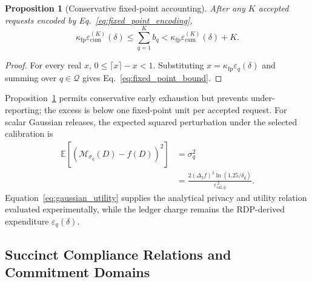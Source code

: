 \documentclass[10pt,journal,compsoc]{IEEEtran}
\newtheorem{proposition}{Proposition}
\begin{document}
\begin{proposition}[Conservative fixed-point accounting]
\label{prop:fixed_point_conservatism}
After any $K$ accepted requests encoded by Eq.~\eqref{eq:fixed_point_encoding},
\begin{equation}
\kappa_{\mathrm{fp}}
\varepsilon_{\mathrm{cum}}^{(K)}(\delta)
\leq
\sum_{q=1}^{K}b_q
<
\kappa_{\mathrm{fp}}
\varepsilon_{\mathrm{cum}}^{(K)}(\delta)
+
K.
\label{eq:fixed_point_bound}
\end{equation}
\end{proposition}

\begin{proof}
For every real $x$, $0\leq\lceil x\rceil-x<1$. Substituting $x=\kappa_{\mathrm{fp}}\varepsilon_q(\delta)$ and summing over $q\in\mathcal{Q}$ gives Eq.~\eqref{eq:fixed_point_bound}.
\end{proof}

Proposition~\ref{prop:fixed_point_conservatism} permits conservative early exhaustion but prevents under-reporting; the excess is below one fixed-point unit per accepted request. For scalar Gaussian releases, the expected squared perturbation under the selected calibration is
\begin{equation}
\begin{aligned}
\mathbb{E}
\left[
\left(
\mathcal{M}_{\sigma_q}(D)-f(D)
\right)^2
\right]
&=
\sigma_q^2\\
&=
\frac{
2(\Delta_2 f)^2
\ln(1.25/\delta_q)
}{
\varepsilon_{\mathrm{cal},q}^{\,2}
}.
\end{aligned}
\label{eq:gaussian_utility}
\end{equation}
Equation~\eqref{eq:gaussian_utility} supplies the analytical privacy and utility relation evaluated experimentally, while the ledger charge remains the RDP-derived expenditure $\varepsilon_q(\delta)$.

\subsection{Succinct Compliance Relations and Commitment Domains}
\label{subsec:zk_commitments}
\end{document}
